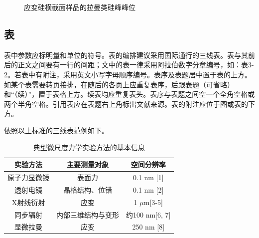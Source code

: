 \begin{figure}[!htbp]
  \centering
  \caption{应变硅横截面样品的拉曼类硅峰峰位}
  \label{fig:sample2}
\end{figure}


\subsection{表}

表中参数应标明量和单位的符号。表的编排建议采用国际通行的三线表。表与其前后的正文之间要有一行的间距；文中的表一律采用阿拉伯数字分章编号，如：表3-2。若表中有附注，采用英文小写字母顺序编号。表序及表题居中置于表的上方。如某个表需要转页接排，在随后的各页上应重复表序，后跟表题（可省略）和“（续）”，置于表格上方。续表均应重复表头。表序与表题之间空一个全角空格或两个半角空格。引用表应在表题右上角标出文献来源。表的附注应位于图或表的下方。

依照以上标准的三线表范例如下。

\begin{table}[!htbp]
  \centering
  \caption{典型微尺度力学实验方法的基本信息}
  \label{tab:tab1}
  \vspace{0.5em}
  \begin{tabular}{ccc}
    \toprule
    \textbf{实验方法} & \textbf{主要测量对象} & \textbf{空间分辨率}    \\
    \midrule
    原子力显微镜        & 表面力             & 0.1 nm {[}1{]}    \\
    透射电镜          & 晶格结构、位错         & 0.1 nm {[}2{]}    \\
    X射线衍射         & 应变              & 1 $\mu$m{[}3-5{]}     \\
    同步辐射          & 内部三维结构与变形       & 约100 nm{[}6, 7{]} \\
    显微拉曼          & 应变              & 250 nm {[}8{]}    \\ 
    \bottomrule
  \end{tabular}
\end{table}

